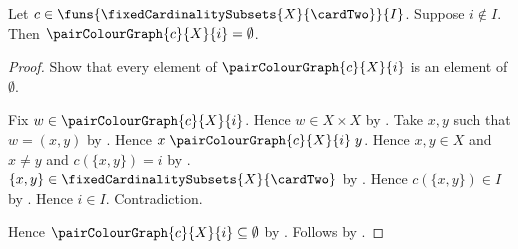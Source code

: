 \begin{proposition}\label{pair_colour_outside_codom_graph_empty}
    Let $c\in\funs{\fixedCardinalitySubsets{X}{\cardTwo}}{I}$.
    Suppose $i\notin I$.
    Then $\pairColourGraph{c}{X}{i}=\emptyset$.
\end{proposition}
\begin{proof}
    Show that every element of $\pairColourGraph{c}{X}{i}$ is an element of
        $\emptyset$.
    \begin{subproof}
        Fix $w\in\pairColourGraph{c}{X}{i}$.
        Hence $w\in X\times X$ by .
        Take $x,y$ such that $w=(x,y)$ by
            .
        Hence $x\mathrel{\pairColourGraph{c}{X}{i}}y$.
        Hence $x,y\in X$ and $x\neq y$ and $c(\{x,y\})=i$ by
            .
        $\{x,y\}\in\fixedCardinalitySubsets{X}{\cardTwo}$ by
            .
        Hence $c(\{x,y\})\in I$ by .
        Hence $i\in I$.
        Contradiction.
    \end{subproof}
    Hence $\pairColourGraph{c}{X}{i}\subseteq\emptyset$ by
        .
    Follows by .
\end{proof}

